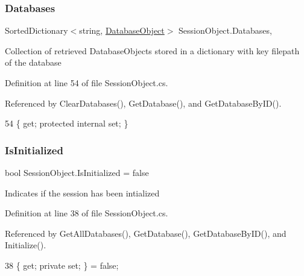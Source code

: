 \subsubsection{\texorpdfstring{Databases}{Databases}}
{\footnotesize\ttfamily Sorted\+Dictionary$<$string, \mbox{\hyperlink{class_database_object}{Database\+Object}}$>$ Session\+Object.\+Databases\hspace{0.3cm}{\ttfamily [get]}, {\ttfamily [set]}}



Collection of retrieved Database\+Objects stored in a dictionary with key filepath of the database 



Definition at line 54 of file Session\+Object.\+cs.



Referenced by Clear\+Databases(), Get\+Database(), and Get\+Database\+By\+I\+D().


\begin{DoxyCode}
54 \{ \textcolor{keyword}{get}; \textcolor{keyword}{protected} \textcolor{keyword}{internal} \textcolor{keyword}{set}; \}
\end{DoxyCode}
\mbox{\label{class_session_object_ae0885b9054fc3ce287307ac16ff69990}} 
\subsubsection{\texorpdfstring{Is\+Initialized}{IsInitialized}}
{\footnotesize\ttfamily bool Session\+Object.\+Is\+Initialized = false\hspace{0.3cm}{\ttfamily [get]}}



Indicates if the session has been intialized 



Definition at line 38 of file Session\+Object.\+cs.



Referenced by Get\+All\+Databases(), Get\+Database(), Get\+Database\+By\+I\+D(), and Initialize().


\begin{DoxyCode}
38 \{ \textcolor{keyword}{get}; \textcolor{keyword}{private} \textcolor{keyword}{set}; \} = \textcolor{keyword}{false};
\end{DoxyCode}
\mbox{\label{class_session_object_a697c071c812fbf7ad1166b896fb44c16}} 
